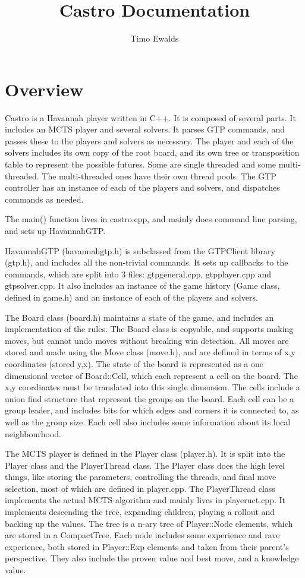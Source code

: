 \documentclass[12pt]{article}          %
\begin{document}
\title{Castro Documentation}
\author{ Timo Ewalds }
\maketitle



\section{Overview}

Castro is a Havannah player written in C++. It is composed of several parts. It includes an MCTS player and several solvers. It parses GTP commands, and passes these to the players and solvers as necessary. The player and each of the solvers includes its own copy of the root board, and its own tree or transposition table to represent the possible futures. Some are single threaded and some multi-threaded. The multi-threaded ones have their own thread pools. The GTP controller has an instance of each of the players and solvers, and dispatches commands as needed.

The main() function lives in castro.cpp, and mainly does command line parsing, and sets up HavannahGTP.

HavannahGTP (havannahgtp.h) is subclassed from the GTPClient library (gtp.h), and includes all the non-trivial commands. It sets up callbacks to the commands, which are split into 3 files: gtpgeneral.cpp, gtpplayer.cpp and gtpsolver.cpp. It also includes an instance of the game history (Game class, defined in game.h) and an instance of each of the players and solvers.

The Board class (board.h) maintains a state of the game, and includes an implementation of the rules. The Board class is copyable, and supports making moves, but cannot undo moves without breaking win detection. All moves are stored and made using the Move class (move.h), and are defined in terms of x,y coordinates (stored y,x). The state of the board is represented as a one dimensional vector of Board::Cell, which each represent a cell on the board. The x,y coordinates must be translated into this single dimension. The cells include a union find structure that represent the groups on the board. Each cell can be a group leader, and includes bits for which edges and corners it is connected to, as well as the group size. Each cell also includes some information about its local neighbourhood.

The MCTS player is defined in the Player class (player.h). It is split into the Player class and the PlayerThread class. The Player class does the high level things, like storing the parameters, controlling the threads, and final move selection, most of which are defined in player.cpp. The PlayerThread class implements the actual MCTS algorithm and mainly lives in playeruct.cpp. It implements descending the tree, expanding children, playing a rollout and backing up the values. The tree is a n-ary tree of Player::Node elements, which are stored in a CompactTree. Each node includes some experience and rave experience, both stored in Player::Exp elements and taken from their parent's perspective. They also include the proven value and best move, and a knowledge value.
\end{document}
